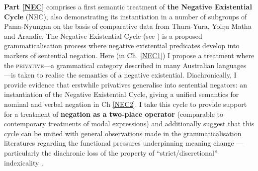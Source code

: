 \documentclass[12pt,dvipsnames]{report}
\begin{document}

 
 \textbf{Part \ref{NEC}} comprises a first semantic treatment of \textbf{the Negative Existential Cycle} (NƎC), also demonstrating its instantiation in a number of subgroups of Pama-Nyungan on the basis of comparative data from Thura-Yura, Yolŋu Matha and Arandic. The Negative Existential Cycle (see \citealt{Croft1991,Veselinova2016}) is a proposed grammaticalisation process where negative existential predicates develop into markers of sentential negation. Here (in Ch. \ref{NEC1}) I propose a treatment where the \textsc{privative}---a grammatical category described in many Australian languages \citep[\textit{e.g.},][]{Dixon2002a,Phillips2021b}---is taken to realise the semantics of a negative existential. Diachronically, I provide evidence that erstwhile privatives generalise into sentential negators: an instantiation of the Negative Existential Cycle, giving a unified semantics for nominal and verbal negation in Ch \ref{NEC2}. I take this cycle to provide support for a treatment of \textbf{negation as a two-place operator} (comparable to contemporary treatments of modal expressions) and additionally suggest that this cycle can be united with general observations made in the grammaticalisation literatures regarding the functional pressures underpinning meaning change --- particularly the diachronic loss of the property of ``strict/discretional'' indexicality \citep[see][]{Perry2012}.
 
\end{document}
